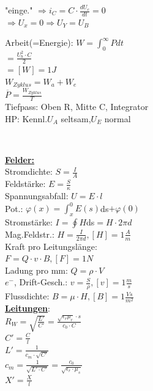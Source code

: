 \documentclass[8pt]{extarticle}
\begin{document}
\begin{minipage}{0.33\textwidth}
"einge." $\Rightarrow i_C = C \cdot \frac{dU_c}{dt} = 0$\\
\phantom{sss} $\Rightarrow U_x = 0 \Rightarrow U_Y = U_B$

Arbeit(=Energie): $W = \int_0^\infty P dt$\\
\phantom{sssssssss} $= \frac{U_b^2 \cdot C}{2} $\\
\phantom{sssssssss} $= [W] = 1J $\\
$W_{Zyklus} = W_a + W_e$\\
$\overline{P} = \frac{W_{Zyklus}}{T}$\\
Tiefpass: Oben R, Mitte C, Integrator\\
HP: Kennl.$U_A$ seltsam,$U_E$ normal
\end{minipage}%
~~~~~~~
\begin{minipage}{0.33\textwidth}

\underline{\textbf{Felder:}}\\
Stromdichte: $S=\frac{I}{A}$\\
Feldstärke: $E=\frac{S}{\kappa}$\\
Spannungsabfall: $U=E \cdot l$\\
Pot.: $\varphi (x)= \int_x^0 E(s)$ds$ + \varphi(0)$\\
Stromstärke: $I = \oint H $ds$ = H \cdot 2\pi d$\\
Mag.Feldstr.: $H = \frac{I}{2\pi d}, [H] = 1\frac{A}{m}$\\
Kraft pro Leitungslänge:\\
\phantom{ss} $F=Q \cdot v \cdot B, [F] = 1N$\\
Ladung pro mm: $Q = \rho \cdot V$\\
$e^-$, Drift-Gesch.: $v = \frac{S}{\rho}, [v] = 1\frac{m}{s}$\\
Flussdichte: $B=\mu \cdot H, [B] = 1 \frac{Vs}{m^2}$\\
 
\underline{\textbf{Leitungen}}:\\
$R_W = \sqrt{\frac{L'}{C'}} = \frac{\sqrt{\epsilon_r \mu_r} \cdot s}{c_0 \cdot C}$ \\
$C' = \frac{C}{l}$\\
$L' = \frac{1}{c_m \cdot \sqrt{C'}}$\\
$c_m= \frac{1}{\sqrt{L' \cdot C'}} = \frac{c_0}{\sqrt{\epsilon_r \cdot \mu_s}}$\\
$X' = \frac{X}{l}$\\


\end{minipage}
\end{document}
